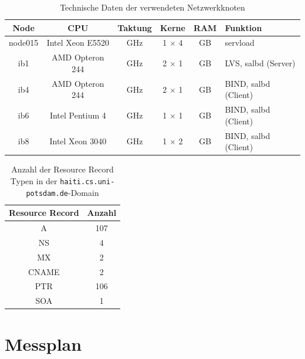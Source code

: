 \documentclass[a4paper, 12pt, BCOR10mm, DIV12, toc=bibliography, toc=listof, german]{scrbook}
\begin{document}
		\begin{table}
			\centering
			\begin{tabular}{|c|c|c|c|c|l|}\hline
				Node & CPU &  Taktung & Kerne & RAM & Funktion \\\hline\hline
				node015 & Intel Xeon E5520 & \unit[2,27]{GHz} & 1 $\times$ 4 & \unit[12]{GB} & servload\\
				ib1 & AMD Opteron 244 & \unit[1,8]{GHz} & 2 $\times$ 1 & \unit[4]{GB} & LVS, salbd (Server)\\
				ib4 & AMD Opteron 244 & \unit[1,8]{GHz} & 2 $\times$ 1 & \unit[4]{GB} & BIND, salbd (Client)\\
				ib6 & Intel Pentium 4 & \unit[2,8]{GHz} & 1 $\times$ 1 & \unit[4]{GB} & BIND, salbd (Client)\\
				ib8 & Intel Xeon 3040 & \unit[1,86]{GHz} & 1 $\times$ 2 & \unit[4]{GB} & BIND, salbd (Client)\\\hline
			\end{tabular}
			\caption{Technische Daten der verwendeten Netzwerkknoten}
			\label{tab:netzwerkknoten}
		\end{table}

		\begin{table}
			\centering
			\begin{tabular}{|c|c|}\hline
				Resource Record & Anzahl \\\hline\hline
				A & 107 \\
				NS & 4 \\
				MX & 2 \\
				CNAME & 2 \\
				PTR & 106 \\
				SOA & 1 \\\hline
			\end{tabular}
			\caption{Anzahl der Resource Record Typen in der \texttt{haiti.cs.uni-potsdam.de}-Domain}
			\label{tab:rr-domain}
		\end{table}
			

		\section{Messplan} %
		\label{sec:messplan}
\end{document}
